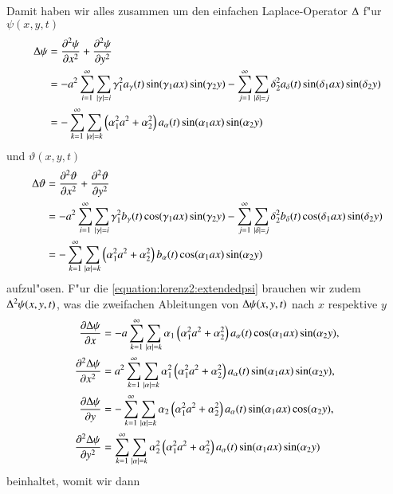 Damit haben wir alles zusammen um den einfachen Laplace-Operator $\laplace$ 
f"ur $\psi(x,y,t)$
\begin{align*}
\laplace\psi
&= 
\frac{\partial^2\psi}{\partial x^2}
+
\frac{\partial^2\psi}{\partial y^2}
\\
&=
-
a^2
\sum_{i = 1}^{\infty}
\sum_{|\gamma| = i}
\gamma_1^2
a_{\gamma}(t)
\sin(\gamma_1 ax) \sin(\gamma_2 y)
-
\sum_{j = 1}^{\infty}
\sum_{|\delta| = j}
\delta_2^2
a_{\delta}(t) 
\sin(\delta_1 ax) \sin(\delta_2 y)
\\
&=
-
\sum_{k = 1}^{\infty}
\sum_{|\alpha| = k}
\left(\alpha_1^2 a^2 + \alpha_2^2 \right)
a_{\alpha}(t)
\sin(\alpha_1 ax) \sin(\alpha_2 y)
\end{align*}
und $\vartheta(x,y,t)$
\begin{align*}
\laplace\vartheta &= 
\frac{\partial^2\vartheta}{\partial x^2}
+
\frac{\partial^2\vartheta}{\partial y^2} \\
&=
-
a^2
\sum_{i = 1}^{\infty}
\sum_{|\gamma| = i}
\gamma_1^2
b_{\gamma}(t)
\cos(\gamma_1 ax) \sin(\gamma_2 y)
-
\sum_{j = 1}^{\infty}
\sum_{|\delta| = j}
\delta_2^2
b_{\delta}(t)
\cos(\delta_1 ax) \sin(\delta_2 y)
\\
&=
-
\sum_{k = 1}^{\infty}
\sum_{|\alpha| = k}
\left(\alpha_1^2 a^2 + \alpha_2^2\right)
b_{\alpha}(t)
\cos(\alpha_1 ax) \sin(\alpha_2 y)
\end{align*}
aufzul"osen. F"ur die \cref{equation:lorenz2:extendedpsi} brauchen wir zudem 
$\laplace^2\psi(x,y,t)$, was die zweifachen Ableitungen von 
$\laplace\psi(x,y,t)$ nach $x$ respektive $y$
\begin{align*}
\frac{\partial\laplace\psi}{\partial x} &=
-
a
\sum_{k = 1}^{\infty}
\sum_{|\alpha| = k}
\alpha_1
\left(\alpha_1^2 a^2 + \alpha_2^2 \right)
a_{\alpha}(t)
\cos(\alpha_1 ax) \sin(\alpha_2 y),
\\
\frac{\partial^2\laplace\psi}{\partial x^2}
&=
a^2
\sum_{k = 1}^{\infty}
\sum_{|\alpha| = k}
\alpha_1^2
\left(\alpha_1^2 a^2+\alpha_2^2\right)
a_{\alpha}(t)
\sin(\alpha_1 ax) \sin(\alpha_2 y),
\\
\frac{\partial\laplace\psi}{\partial y}
&=
-
\sum_{k = 1}^{\infty}
\sum_{|\alpha| = k}
\alpha_2
\left(\alpha_1^2 a^2 + \alpha_2^2 \right)
a_{\alpha}(t)
\sin(\alpha_1 ax) \cos(\alpha_2 y),
\\
\frac{\partial^2\laplace\psi}{\partial y^2}
&=
\sum_{k = 1}^{\infty}
\sum_{|\alpha| = k}
\alpha_2^2
\left(\alpha_1^2 a^2+\alpha_2^2\right)
a_{\alpha}(t)
\sin(\alpha_1 ax) \sin(\alpha_2 y)
\end{align*}
beinhaltet, womit wir dann
